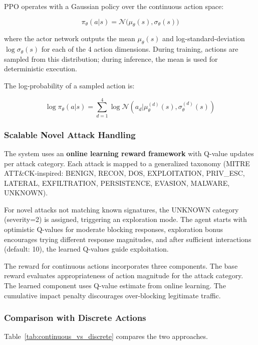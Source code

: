 \documentclass[conference]{IEEEtran}
\begin{document}
PPO operates with a Gaussian policy over the continuous action space:

\begin{equation}
\pi_\theta(a | s) = \mathcal{N}\big(\mu_\theta(s), \sigma_\theta(s)\big)
\end{equation}

where the actor network outputs the mean $\mu_\theta(s)$ and log-standard-deviation $\log\sigma_\theta(s)$ for each of the 4 action dimensions. During training, actions are sampled from this distribution; during inference, the mean is used for deterministic execution.

The log-probability of a sampled action is:

\begin{equation}
\log \pi_\theta(a | s) = \sum_{d=1}^{4} \log \mathcal{N}(a_d | \mu_\theta^{(d)}(s), \sigma_\theta^{(d)}(s))
\end{equation}

\subsubsection{Scalable Novel Attack Handling}

The system uses an \textbf{online learning reward framework} with Q-value updates per attack category. Each attack is mapped to a generalized taxonomy (MITRE ATT\&CK-inspired: BENIGN, RECON, DOS, EXPLOITATION, PRIV\_ESC, LATERAL, EXFILTRATION, PERSISTENCE, EVASION, MALWARE, UNKNOWN).

For novel attacks not matching known signatures, the UNKNOWN category (severity=2) is assigned, triggering an exploration mode. The agent starts with optimistic Q-values for moderate blocking responses, exploration bonus encourages trying different response magnitudes, and after sufficient interactions (default: 10), the learned Q-values guide exploitation.

The reward for continuous actions incorporates three components. The base reward evaluates appropriateness of action magnitude for the attack category. The learned component uses Q-value estimate from online learning. The cumulative impact penalty discourages over-blocking legitimate traffic.

\subsubsection{Comparison with Discrete Actions}

Table~\ref{tab:continuous_vs_discrete} compares the two approaches.
\end{document}
